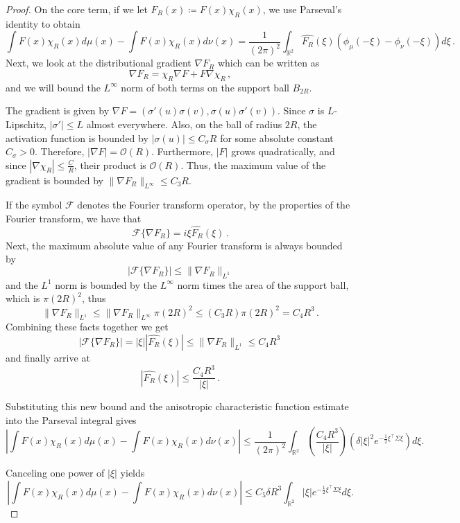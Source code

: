 \begin{proof}
    On the core term, if we let $F_R(x) \coloneqq F (x) \chi_R(x)$, we use Parseval's identity to obtain
    \[
        \int F(x)\chi_R(x) d\mu(x) - \int F(x)\chi_R(x) d\nu(x)  = \frac{1}{(2\pi)^2} \int_{\mathbb{R}^2} \widehat{F_R}(\xi) (\phi_\mu(-\xi) - \phi_\nu(-\xi)) d\xi\, .
    \]
    Next, we look at the distributional gradient $\nabla F_R$ which can be written as
    \[
        \nabla F_R = \chi_R \nabla F + F \nabla \chi_R\, ,
    \]
    and we will bound the $L^\infty$ norm of both terms on the support ball $B_{2R}$. 
    
    The gradient is given by $\nabla F = (\sigma'(u)\sigma(v), \sigma(u)\sigma'(v))$. Since $\sigma$ is $L$-Lipschitz, $|\sigma'| \le L$ almost everywhere. Also, on the ball of radius $2R$, the activation function is bounded by $|\sigma(u)| \leq C_{\sigma}R$ for some absolute constant $C_{\sigma} > 0$. Therefore, $|\nabla F| = \mathcal{O}(R)$. Furthermore, $|F|$ grows quadratically, and since $|\nabla \chi_R| \leq \frac{C}{R}$, their product is $\mathcal{O}(R)$. Thus, the maximum value of the gradient is bounded by $\|\nabla F_R\|_{L^\infty} \le C_3 R$.
    
    If the symbol $\mathcal{F}$ denotes the Fourier transform operator, by the properties of the Fourier transform, we have that
    \[
        \mathcal{F}\{\nabla F_R\} = i\xi \widehat{F_R}(\xi)\,.
    \]
    Next, the maximum absolute value of any Fourier transform is always bounded by 
    \[
        |\mathcal{F}\{\nabla F_R\}| \leq \|\nabla F_R\|_{L^1}
    \]
    and the $L^1$ norm is bounded by the $L^\infty$ norm times the area of the support ball, which is $\pi(2R)^2$, thus
    \[
        \|\nabla F_R\|_{L^1} \leq \|\nabla F_R\|_{L^\infty}\pi (2R)^2 \leq (C_3 R) \pi (2R)^2 = C_4 R^3\, .
    \]
    Combining these facts together we get
    \[
        |\mathcal{F}\{\nabla F_R\}| =|\xi| |\widehat{F_R}(\xi)| \le \|\nabla F_R\|_{L^1} \le C_4 R^3\,
    \]
    and finally arrive at
    \[
        |\widehat{F_R}(\xi)| \le \frac{C_4 R^3}{|\xi|}\, .
    \]

    Substituting this new bound and the anisotropic characteristic function estimate into the Parseval integral gives
    \[
        \left| \int F(x)\chi_R(x)d\mu(x) - \int F(x)\chi_R(x)d\nu(x) \right| \le \frac1{(2\pi)^2} \int_{\mathbb R^2} \left( \frac{C_4R^3}{|\xi|} \right) \left( \delta |\xi|^2 e^{-\frac12\xi^\top\Sigma\xi} \right)d\xi .
    \]
    
    Canceling one power of $|\xi|$ yields
    \[
        \left| \int F(x)\chi_R(x)d\mu(x) - \int F(x)\chi_R(x)d\nu(x) \right| \le C_5\delta R^3 \int_{\mathbb R^2} |\xi| e^{-\frac12\xi^\top\Sigma\xi}d\xi .
    \]
    

\end{proof}

